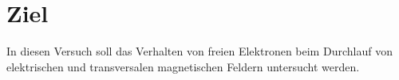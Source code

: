 \section{Ziel}
\label{sec:Ziel}
In diesen Versuch soll das Verhalten von freien Elektronen beim Durchlauf von elektrischen
und transversalen magnetischen Feldern untersucht werden. 
